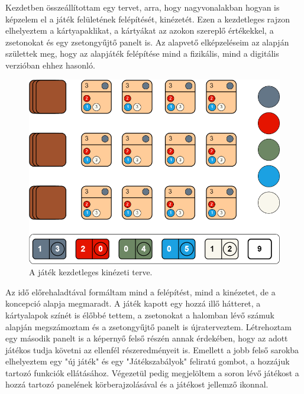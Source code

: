


Kezdetben összeállítottam egy tervet, arra, hogy nagyvonalakban hogyan is képzelem el a játék felületének felépítését, kinézetét. Ezen a kezdetleges rajzon elhelyeztem a kártyapaklikat, a kártyákat az azokon szereplő értékekkel, a zsetonokat és egy zsetongyűjtő panelt is. Az alapvető elképzeléseim az alapján születtek meg, hogy az alapjáték felépítése mind a fizikális, mind a digitális verzióban ehhez hasonló.

\begin{figure}[h]
\centering
\includegraphics[scale=0.37]{images/screen_structure_plan.png}
\caption{A játék kezdetleges kinézeti terve.}
\label{fig:screen_structure_plan}
\end{figure}



Az idő előrehaladtával formáltam mind a felépítést, mind a kinézetet, de a koncepció alapja megmaradt. A játék kapott egy hozzá illő hátteret, a kártyalapok színét is élőbbé tettem, a zsetonokat a halomban lévő számuk alapján megszámoztam és a zsetongyűjtő panelt is újraterveztem. Létrehoztam egy második panelt is a képernyő felső részén annak érdekében, hogy az adott játékos tudja követni az ellenfél részeredményeit is.
Emellett a jobb felső sarokba elhelyeztem egy "új játék" és egy "Játékszabályok" feliratú gombot, a hozzájuk tartozó funkciók ellátásához. Végezetül pedig megjelöltem a soron lévő játékost a hozzá tartozó panelének körberajzolásával és a játékost jellemző ikonnal.

